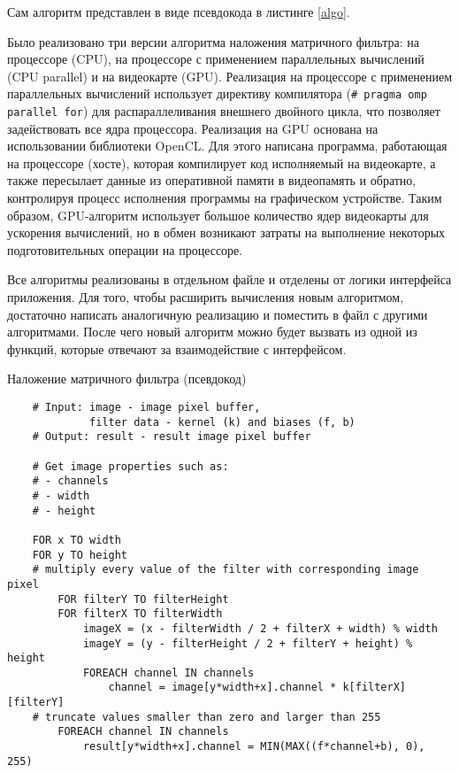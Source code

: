 Сам алгоритм представлен в виде псевдокода в листинге \ref{algo}.

Было реализовано три версии алгоритма наложения матричного фильтра: на процессоре (CPU), на процессоре с применением параллельных 
вычислений (CPU parallel) и на видеокарте (GPU). Реализация на процессоре с применением параллельных вычислений использует директиву 
компилятора (\verb!# pragma omp parallel for!) для распараллеливания внешнего двойного цикла, что позволяет задействовать все ядра процессора. 
Реализация на GPU основана на использовании библиотеки OpenCL. Для этого написана программа, работающая на процессоре (хосте), 
которая компилирует код исполняемый на видеокарте, а также пересылает данные из оперативной памяти в видеопамять и обратно, контролируя 
процесс исполнения программы на графическом устройстве. Таким образом, GPU-алгоритм использует большое количество ядер видеокарты для 
ускорения вычислений, но в обмен возникают затраты на выполнение некоторых подготовительных операции на процессоре.

Все алгоритмы реализованы в отдельном файле и отделены от логики интерфейса приложения. Для того, чтобы расширить вычисления новым 
алгоритмом, достаточно написать аналогичную реализацию и поместить в файл с другими алгоритмами. После чего новый алгоритм можно будет 
вызвать из одной из функций, которые отвечают за взаимодействие с интерфейсом.


\begin{minipage}{0.95\textwidth}
\begin{algorithm}[H]
    \centering
    \caption{Наложение матричного фильтра (псевдокод)}\label{algo}
    \begin{verbatim}
    # Input: image - image pixel buffer,
             filter data - kernel (k) and biases (f, b)
    # Output: result - result image pixel buffer
    
    # Get image properties such as:
    # - channels
    # - width
    # - height
    
    FOR x TO width
    FOR y TO height
    # multiply every value of the filter with corresponding image pixel
        FOR filterY TO filterHeight
        FOR filterX TO filterWidth
            imageX = (x - filterWidth / 2 + filterX + width) % width
            imageY = (y - filterHeight / 2 + filterY + height) % height
            FOREACH channel IN channels
                channel = image[y*width+x].channel * k[filterX][filterY]
    # truncate values smaller than zero and larger than 255
        FOREACH channel IN channels
            result[y*width+x].channel = MIN(MAX((f*channel+b), 0), 255)
    \end{verbatim}
\end{algorithm}
\end{minipage}\hfill

